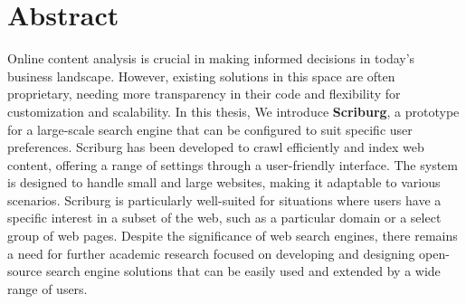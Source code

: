 \chapter*{Abstract}
Online content analysis is crucial in making informed decisions in today's business landscape. However, existing solutions in this space are often proprietary, needing more transparency in their code and flexibility for customization and scalability. In this thesis, We introduce \textbf{Scriburg}, a prototype for a large-scale search engine that can be configured to suit specific user preferences. Scriburg has been developed to crawl efficiently and index web content, offering a range of settings through a user-friendly interface. The system is designed to handle small and large websites, making it adaptable to various scenarios. Scriburg is particularly well-suited for situations where users have a specific interest in a subset of the web, such as a particular domain or a select group of web pages. Despite the significance of web search engines, there remains a need for further academic research focused on developing and designing open-source search engine solutions that can be easily used and extended by a wide range of users.
